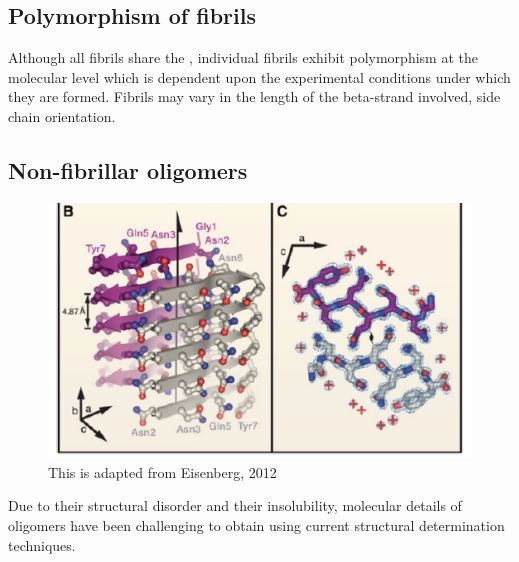 
\subsection{Polymorphism of fibrils}

Although all fibrils share the \crossbs, individual fibrils exhibit polymorphism at the molecular level which is dependent upon the experimental conditions under which they are formed.  %
Fibrils may vary in the length of the beta-strand involved, side chain orientation. 

\subsection{Non-fibrillar oligomers}
\begin{figure}
  \centering
  \includegraphics[width=6in]{figures/introduction/fibril_xray_model.pdf}
  \caption[Characteristic cross-$\beta$ spacings from X-ray fibre diffraction studies of amyloid fibrils]{This is adapted from Eisenberg, 2012}
  \label{fig:fibril_xray_model}
\end{figure}

Due to their structural disorder and their insolubility, molecular details of oligomers have been challenging to obtain using current structural determination techniques. 

